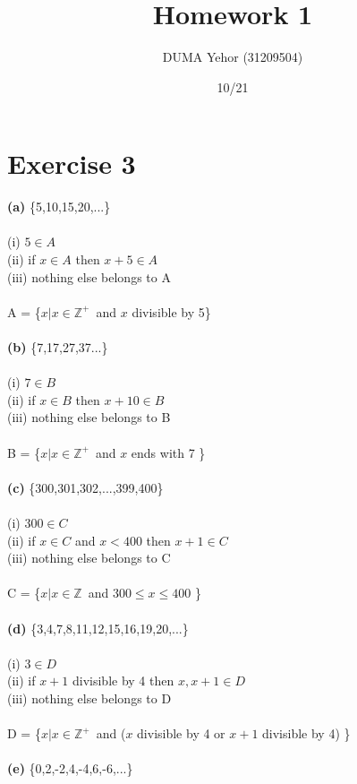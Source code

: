 \documentclass{article}
\title{Homework 1}
\author{DUMA Yehor (31209504)}
\date{10/21}
\begin{document}
\maketitle

\section{Exercise 3}

\textbf{(a)} \{5,10,15,20,...\} \\
\\
(i) $5 \in A$ \\ 
(ii) if $x \in A$ then $x+5 \in A$ \\ 
(iii) nothing else belongs to A \\ 
\\
A = \{$x|x\in{} \mathbb{Z}^+$\ and $x$ divisible by 5\} \\
\\
\textbf{(b)} \{7,17,27,37...\} \\
\\
(i) $7 \in B$ \\ 
(ii) if $x \in B$ then $x+10 \in B$ \\ 
(iii) nothing else belongs to B \\ 
\\
B = \{$x|x\in{} \mathbb{Z}^+$\ and $x$ ends with 7 \} \\
\\
\textbf{(c)} \{300,301,302,...,399,400\} \\
\\
(i) $300 \in C$ \\ 
(ii) if $x \in C$ and $x<400$ then $x+1 \in C$ \\ 
(iii) nothing else belongs to C \\ 
\\
C = \{$x|x\in{} \mathbb{Z}$\ and $300 \leq x \leq 400 $ \} \\
\\
\textbf{(d)} \{3,4,7,8,11,12,15,16,19,20,...\} \\
\\
(i) $3 \in D$ \\ 
(ii) if $x+1$ divisible by 4 then $x, x+1 \in D$ \\ 
(iii) nothing else belongs to D \\ 
\\
D = \{$x|x\in{} \mathbb{Z}^+$\ and ($x$ divisible by 4 or $x+1$ divisible by 4) \} \\
\\
\textbf{(e)} \{0,2,-2,4,-4,6,-6,...\} \\
\end{document}

